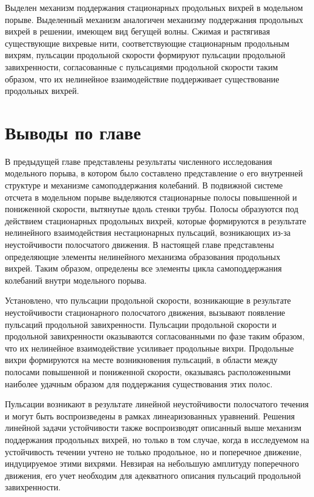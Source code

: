 Выделен механизм поддержания стационарных продольных вихрей в модельном порыве. Выделенный механизм аналогичен механизму поддержания продольных вихрей в решении, имеющем вид бегущей волны. Сжимая и растягивая существующие вихревые нити, соответствующие стационарным продольным вихрям, пульсации продольной скорости формируют пульсации продольной завихренности, согласованные с пульсациями продольной скорости таким образом, что их нелинейное взаимодействие поддерживает существование продольных вихрей. 


\section{Выводы по главе}

В предыдущей главе представлены результаты численного исследования модельного порыва, в котором было составлено представление о его внутренней структуре и механизме самоподдержания колебаний. В подвижной системе отсчета в модельном порыве выделяются стационарные полосы повышенной и пониженной скорости, вытянутые вдоль стенки трубы. Полосы образуются под действием стационарных продольных вихрей, которые формируются в результате нелинейного взаимодействия нестационарных пульсаций, возникающих из-за неустойчивости полосчатого движения. В настоящей главе представлены определяющие элементы нелинейного механизма образования продольных вихрей. Таким образом, определены все элементы цикла самоподдержания колебаний внутри модельного порыва. 

Установлено, что пульсации продольной скорости, возникающие в результате неустойчивости стационарного полосчатого движения, вызывают появление пульсаций продольной завихренности. Пульсации продольной скорости и продольной завихренности оказываются согласованными по фазе таким образом, что их нелинейное взаимодействие усиливает продольные вихри. Продольные вихри формируются на месте возникновения пульсаций, в области между полосами повышенной и пониженной скорости, оказываясь расположенными наиболее удачным образом для поддержания существования этих полос.

Пульсации возникают в результате линейной неустойчивости полосчатого течения и могут быть воспроизведены в рамках линеаризованных уравнений. Решения линейной задачи устойчивости также воспроизводят описанный выше механизм поддержания продольных вихрей, но только в том случае, когда в исследуемом на устойчивость течении учтено не только продольное, но и поперечное движение, индуцируемое этими вихрями. Невзирая на небольшую амплитуду поперечного движения, его учет необходим для адекватного описания пульсаций продольной завихренности. 

